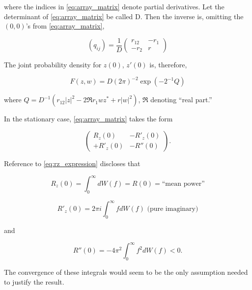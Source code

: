 \documentclass[10pt,twocolumn]{article}
\theoremstyle{definition}
\begin{document}
where the indices in \eqref{eq:array_matrix} denote partial derivatives. Let the determinant of \eqref{eq:array_matrix} be called D. Then the inverse is, omitting the $(0, 0)$'s from \eqref{eq:array_matrix},

\begin{equation}
\label{eq:inverse_matrix}
(q_{ij}) = \frac{1}{D} 
\begin{pmatrix}
r_{12} & -r_1 \\
-r_2 & r
\end{pmatrix}
\end{equation}

The joint probability density for $z(0)$, $z'(0)$ is, therefore,

\begin{equation}
\label{eq:joint_prob_density}
F(z, w) = D(2\pi)^{-2} \exp (-2^{-1}Q)
\end{equation}

where $Q = D^{-1}(r_{12}|z|^2 - 2\mathfrak{R} r_1 wz^* + r |w|^2)$, $\mathfrak{R}$ denoting ``real part.''

In the stationary case, \eqref{eq:array_matrix} takes the form

\begin{equation}
\label{eq:stationary_matrix}
\begin{pmatrix}
R_z(0) & -R'_z(0) \\
+R'_z(0) & -R''(0)
\end{pmatrix}.
\end{equation}

Reference to \eqref{eq:rz_expression} discloses that

\begin{equation}
\label{eq:rz_0}
R_z(0) = \int_{0}^{\infty} dW(f) = R(0) = \text{``mean power''}
\end{equation}

\begin{equation}
\label{eq:rz_prime_0}
R'_z(0) = 2\pi i \int_{0}^{\infty} f dW(f) \text{ (pure imaginary)}
\end{equation}

and

\begin{equation}
\label{eq:rz_double_prime_0}
R''(0) = -4\pi^2 \int_{0}^{\infty} f^2 dW(f) < 0.
\end{equation}

The convergence of these integrals would seem to be the only assumption needed to justify the result.
\end{document}
